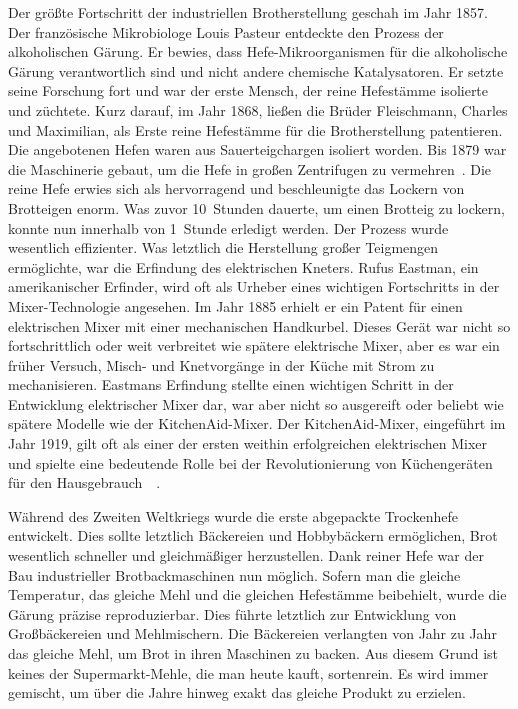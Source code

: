 Der größte Fortschritt der industriellen Brotherstellung geschah im Jahr \num{1857}.
Der französische Mikrobiologe Louis Pasteur entdeckte den Prozess der alkoholischen
Gärung. Er bewies, dass Hefe-Mikroorganismen für die
alkoholische Gärung verantwortlich sind und nicht andere chemische Katalysatoren. Er setzte
seine Forschung fort und war der erste Mensch, der reine Hefestämme isolierte und züchtete.
Kurz darauf, im Jahr \num{1868}, ließen die Brüder Fleischmann, Charles und Maximilian, als
Erste reine Hefestämme für die Brotherstellung patentieren. Die angebotenen Hefen waren
aus Sauerteigchargen isoliert worden. Bis \num{1879} war die Maschinerie gebaut,
um die Hefe in großen Zentrifugen zu vermehren~\cite{fleischmann+history}. Die
reine Hefe erwies sich als hervorragend und beschleunigte das Lockern von Brotteigen
enorm. Was zuvor 10~Stunden dauerte, um einen Brotteig zu lockern, konnte nun
innerhalb von 1~Stunde erledigt werden. Der Prozess wurde wesentlich effizienter. Was
letztlich die Herstellung großer Teigmengen ermöglichte, war die Erfindung
des elektrischen Kneters. Rufus Eastman, ein amerikanischer Erfinder, wird oft
als Urheber eines wichtigen Fortschritts in der Mixer-Technologie angesehen. Im Jahr \num{1885}
erhielt er ein Patent für einen elektrischen Mixer mit einer mechanischen Handkurbel.
Dieses Gerät war nicht so fortschrittlich oder weit verbreitet wie spätere
elektrische Mixer, aber es war ein früher Versuch, Misch- und Knetvorgänge
in der Küche mit Strom zu mechanisieren. Eastmans Erfindung stellte
einen wichtigen Schritt in der Entwicklung elektrischer Mixer dar, war aber nicht so
ausgereift oder beliebt wie spätere Modelle wie der KitchenAid-Mixer. Der
KitchenAid-Mixer, eingeführt im Jahr \num{1919}, gilt oft als einer der
ersten weithin erfolgreichen elektrischen Mixer und spielte eine bedeutende Rolle
bei der Revolutionierung von Küchengeräten für den
Hausgebrauch~\cite{first+mixer}~\cite{kitchenaid+history}.

Während des Zweiten Weltkriegs wurde die erste abgepackte Trockenhefe entwickelt. Dies sollte
letztlich Bäckereien und Hobbybäckern ermöglichen, Brot wesentlich schneller und
gleichmäßiger herzustellen. Dank reiner Hefe war der Bau industrieller Brotbackmaschinen
nun möglich. Sofern man die gleiche Temperatur, das gleiche Mehl und die gleichen
Hefestämme beibehielt, wurde die Gärung präzise reproduzierbar. Dies führte letztlich
zur Entwicklung von Großbäckereien und Mehlmischern. Die Bäckereien verlangten
von Jahr zu Jahr das gleiche Mehl, um Brot in ihren Maschinen zu backen. Aus diesem
Grund ist keines der Supermarkt-Mehle, die man heute kauft, sortenrein. Es wird
immer gemischt, um über die Jahre hinweg exakt das gleiche Produkt zu erzielen.

